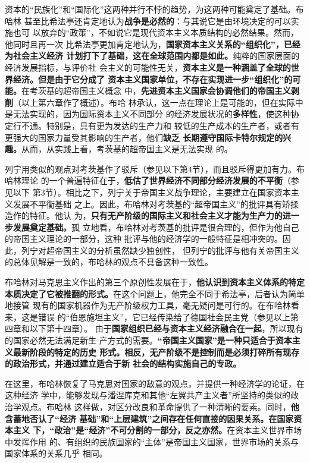 资本的“民族化”和“国际化”这两种并行不悖的趋势，为这两种可能奠定了基础。布哈林
甚至比希法亭还肯定地认为\textbf{战争是必然的}：与其说它是由环境决定的可以实施也可
以放弃的“政策”，不如说它是现代资本主义本质结构的必然结果。然而，他同时且再一次
比希法亭更加肯定地认为，\textbf{国家资本主义关系的“组织化”，已经为社会主义经济
  计划打下了基础，这在全球范围内都是如此。}纯粹的国家层面的经济发展指标，与评价社
会主义的可能性无关，\textbf{资本主义是一种涵盖了全球的世界经济。但是由于它分成了
  资本主义国家单位，不存在实现进一步“组织化”的可能。}在考茨基的超帝国主义概念
中，\textbf{先进资本主义国家会协调他们的帝国主义剥削}（以上第六章作了概述）。布哈
林承认，这一点在理论上是可能的，但在实际中是无法实现的，因为国际资本主义不同部分
的经济发展状况的\textbf{多样性}，使这种协定行不通。特别是，具有更为发达的生产力和
较低的生产成本的生产者，或者有更强大的国家力量受其影响的生产者，他们\textbf{缺乏
  长期遵守国际卡特尔规定的兴趣。}从而，从实践上看，考茨基的超帝国主义是无法实现
的。

列宁用类似的观点对考茨基作了驳斥（参见以下第4节），而且驳斥得更加有力。布哈林理论
的一个普遍特征在于，\textbf{低估了世界经济不同部分经济发展的不平衡}（参见以下
第3节）。相比之下，列宁关于帝国主义战争理论，主要建立在国家资本主义发展不平衡基础
之上。因此，布哈林对考茨基的“超帝国主义”的批评具有矫揉造作的特征。他认
为，\textbf{只有无产阶级的国际主义和社会主义才能为生产力的进一步发展奠定基础。}孤
立地看，布哈林对考茨基的批评是很合理的，但作为他自己的帝国主义理论的一部分，这种
批评与他的经济学的一般特征是相冲突的。因此，列宁对超帝国主义的分析虽然缺少独创性，
但列宁的批评与他有关帝国主义的总体见解是一致的，布哈林的观点不具备这种一致性。

布哈林对马克思主义作出的第三个原创性发展在于，\textbf{他认识到资本主义体系的特定
  本质决定了它被推翻的形式。}在这个问题上，他完全不同于希法亭，后者认为简单地接管
现有的国家机器作为无产阶级权力工具，毫无疑问是可行的。在布哈林看来，这是错误
的“伯恩施坦主义”，它已经传染给了德国社会民主党（参见以上第四章和以下第十四章）。
由于\textbf{国家组织已经与资本主义经济融合在一起}，所以现有的国家必然无法满足新生
产方式的需要。\textbf{“帝国主义国家”是一种只适合于资本主义最新阶段的特定的历史
  形式。相反，无产阶级不是控制而是必须打碎所有现存的政治形式，并通过建立适合于新
  社会的结构实施自己的专政。}

在这里，布哈林恢复了马克思对国家的敌意的观点，并提供一种经济学的论证，在这种经济
学中，能够发现与潘涅库克和其他“左翼共产主义者”所坚持的类似的政治学观点。布哈林
这样做，对区分改良和革命提供了一种清晰的要素。同时，\textbf{他含蓄地否认了“经济
  基础”和“上层建筑”之间存在任何直接的因果关系。在国家资本主义
  下，“政治”是“经济”不可分割的一部分，反之亦然。}在资本主义世界市场中发挥作用
的、有组织的民族国家的“主体”是帝国主义国家，世界市场的关系与国家体系的关系几乎
相同。


